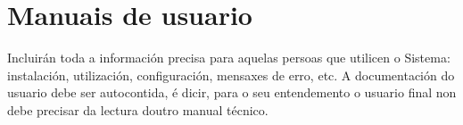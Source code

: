 \chapter{Manuais de usuario}

Incluirán toda a información precisa para aquelas persoas que utilicen o Sistema: instalación, utilización, configuración, mensaxes de erro, etc. A documentación do usuario debe ser autocontida, é dicir, para o seu entendemento o usuario final non debe precisar da lectura doutro manual técnico.
